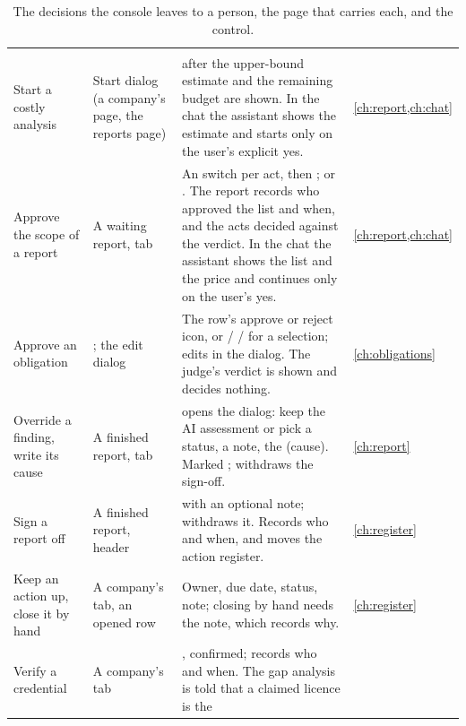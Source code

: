 \begin{xltabular}{\textwidth}{@{}L{30mm}L{34mm}YL{18mm}@{}}
\caption{The decisions the console leaves to a person, the page that carries each, and the
control.}\label{tab:console:decisions}\\
\toprule
{} &  &  &  \\
\midrule
\endfirsthead
\toprule
{} &  &  &  \\
\midrule
\endhead
\bottomrule
\endlastfoot
Start a costly analysis & Start dialog (a company's page, the reports page) &  after the upper-bound estimate and the remaining budget are shown. In the chat the
assistant shows the estimate and starts only on the user's explicit yes. & \cref{ch:report,ch:chat} \\
Approve the scope of a report & A waiting report,  tab & An  switch
per act, then ; or . The report records who approved
the list and when, and the acts decided against the verdict. In the chat the assistant shows the
list and the price and continues only on the user's yes. & \cref{ch:report,ch:chat} \\
Approve an obligation & ; the edit dialog & The row's approve or reject
icon, or  /  /  for a
selection; edits in the dialog. The judge's verdict is shown and decides nothing. &
\cref{ch:obligations} \\
Override a finding, write its cause & A finished report,  tab &  opens
the dialog: keep the AI assessment or pick a status, a note, the  (cause). Marked
; withdraws the sign-off. & \cref{ch:report} \\
Sign a report off & A finished report, header &  with an optional note;
 withdraws it. Records who and when, and moves the action register. &
\cref{ch:register} \\
Keep an action up, close it by hand & A company's  tab, an opened row & Owner, due
date, status, note; closing by hand needs the note, which records why. & \cref{ch:register} \\
Verify a credential & A company's  tab & ,
confirmed; records who and when. The gap analysis is told that a claimed licence is the

\end{xltabular}
